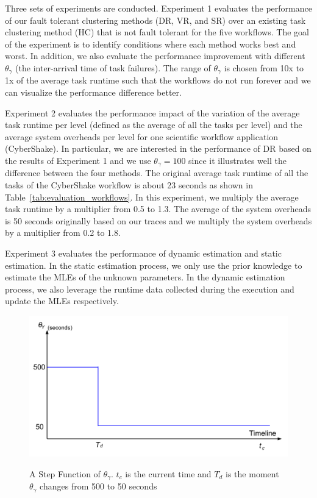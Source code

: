 \documentclass{IOS-Book-Article}
\begin{document}
Three sets of experiments are conducted. Experiment 1 evaluates the performance of our fault tolerant clustering methods (DR, VR, and SR) over an existing task clustering method (HC) that is not fault tolerant for the five workflows. The goal of the experiment is to identify conditions where each method works best and worst. In addition, we also evaluate the performance improvement with different $\theta_{\gamma}$ (the inter-arrival time of task failures). The range of $\theta_{\gamma}$ is chosen from 10x to 1x of the average task runtime such that the workflows do not run forever and we can visualize the performance difference better. 


Experiment 2 evaluates the performance impact of the variation of the average task runtime per level (defined as the average of all the tasks per level) and the average system overheads per level for one scientific workflow application (CyberShake). In particular, we are interested in the performance of DR based on the results of Experiment 1 and we use $\theta_{\gamma}=100$ since it illustrates well the difference between the four methods. The original average task runtime of all the tasks of the CyberShake workflow is about 23 seconds as shown in Table~\ref{tab:evaluation_workflows}. In this experiment, we multiply the average task runtime by a multiplier from 0.5 to 1.3. The average of the system overheads is 50 seconds originally based on our traces and we multiply the system overheads by a multiplier from 0.2 to 1.8.  

Experiment 3 evaluates the performance of dynamic estimation and static estimation. In the static estimation process, we only use the prior knowledge to estimate the MLEs of the unknown parameters. In the dynamic estimation process, we also leverage the runtime data collected during the execution and update the MLEs respectively. 

\begin{figure}[htb]
	\centering
	\includegraphics[width=0.8\linewidth]{step_signal.pdf} \\
	\caption{A Step Function of $\theta_{\gamma}$. $t_c$ is the current time and $T_d$ is the moment $\theta_{\gamma}$ changes from 500 to 50 seconds}
	\label{fig:evaluation_step_signal}
\end{figure}
\end{document}
